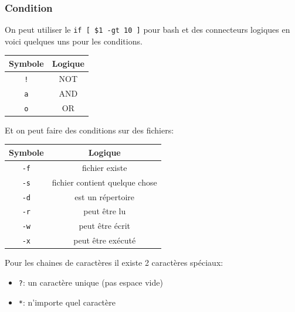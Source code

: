 \subsubsection{Condition}\label{condition}

On peut utiliser le \texttt{if\ {[}\ \$1\ -gt\ 10\ {]}} pour bash et des
connecteurs logiques en voici quelques uns pour les conditions.

\begin{longtable}[]{@{}cc@{}}
\toprule\noalign{}
Symbole & Logique \\
\midrule\noalign{}
\endhead
\bottomrule\noalign{}
\endlastfoot
\texttt{!} & NOT \\
\texttt{a} & AND \\
\texttt{o} & OR \\
\end{longtable}

Et on peut faire des conditions sur des fichiers:

\begin{longtable}[]{@{}cc@{}}
\toprule\noalign{}
Symbole & Logique \\
\midrule\noalign{}
\endhead
\bottomrule\noalign{}
\endlastfoot
\texttt{-f} & fichier existe \\
\texttt{-s} & fichier contient quelque chose \\
\texttt{-d} & est un répertoire \\
\texttt{-r} & peut être lu \\
\texttt{-w} & peut être écrit \\
\texttt{-x} & peut être exécuté \\
\end{longtable}

Pour les chaines de caractères il existe 2 caractères spéciaux:

\begin{itemize}
\tightlist
\item
  \texttt{?}: un caractère unique (pas espace vide)
\item
  \texttt{*}: n'importe quel caractère
\end{itemize}
